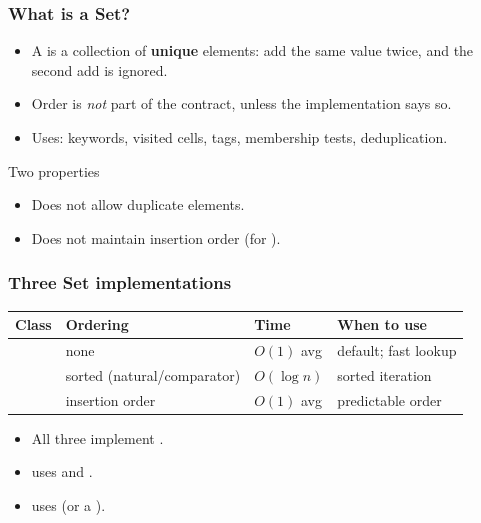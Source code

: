 \documentclass[aspectratio=169,10pt,compress]{beamer}
\begin{document}
\begin{frame}[t,fragile] \frametitle{What is a Set?}
  \begin{itemize}
    \item A  is a collection of \textbf{unique} elements:
          add the same value twice, and the second add is ignored.
    \item Order is \emph{not} part of the contract, unless the implementation says so.
    \item Uses: keywords, visited cells, tags, membership tests, deduplication.
  \end{itemize}
  \begin{block}{Two properties}
    \begin{itemize}
      \item Does not allow duplicate elements.
      \item Does not maintain insertion order (for ).
    \end{itemize}
  \end{block}
\end{frame}




\begin{frame}[t,fragile] \frametitle{Three Set implementations}
  \begin{center}\small
  \begin{tabular}{L{0.20\textwidth}L{0.26\textwidth}L{0.14\textwidth}L{0.28\textwidth}}
    \toprule
    \textbf{Class} & \textbf{Ordering}             & \textbf{Time}   & \textbf{When to use} \\
    \midrule
           & none                          & $O(1)$ avg  & default; fast lookup \\
           & sorted (natural/comparator)   & $O(\log n)$ & sorted iteration \\
     & insertion order               & $O(1)$ avg  & predictable order \\
    \bottomrule
  \end{tabular}
  \end{center}
  \vspace{0.3em}
  \begin{itemize}\small
    \item All three implement .
    \item {} uses  and .
    \item {} uses  (or a ).
  \end{itemize}
\end{frame}
\end{document}
